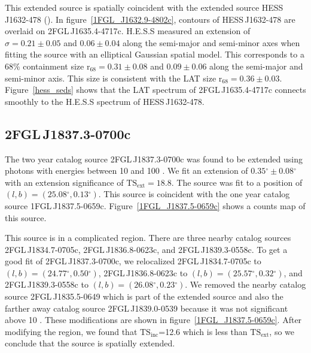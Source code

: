 \documentclass[12pt,preprint]{aastex}
\newcommand{\gev}{\text{GeV}\xspace}
\newcommand{\tev}{\text{TeV}\xspace}
\newcommand{\tsext}{{\ensuremath{\text{TS}_\text{ext}}}\xspace}
\newcommand{\tsinc}{\ensuremath{\text{TS}_\text{inc}}\xspace}
\newcommand{\rsixeight}{{\ensuremath{\text{r}_{68}}}\xspace}
\renewcommand{\deg}{\ensuremath{^\circ}\xspace}
\begin{document}
This extended source is spatially coincident with the extended
\tev source HESS\,J1632-478 (\cite{hess_plane_survey}).  In
figure~\ref{1FGL_J1632.9-4802c}, contours of  HESS\,J1632-478 are
overlaid on 2FGL\,J1635.4-4717c.  H.E.S.S measured an extension of
$\sigma=0.21\pm0.05$ and $0.06\pm0.04$ along the semi-major and semi-minor
axes when fitting the source with an elliptical Gaussian spatial model.
This corresponds to a 68\% containment size $\rsixeight=0.31\pm0.08$
and $0.09\pm0.06$ along the semi-major and semi-minor axis. This
size is consistent with the LAT size $\rsixeight=0.36\pm0.03$.
Figure~\ref{hess_seds} shows that the LAT spectrum of 2FGL\,J1635.4-4717c
connects smoothly to the H.E.S.S spectrum of HESS\,J1632-478.


\subsection{2FGL\,J1837.3-0700c}
\label{section_2FGL_J1837.3-0700c}




The two year catalog source 2FGL\,J1837.3-0700c was found to be
extended using photons with energies between 10 \gev and 100 \gev.
We fit an extension of $0.35\deg\pm0.08\deg$ with an extension
significance of $\tsext=18.8$.  The source was fit to a position of
$(l,b)=(25.08\deg,0.13\deg)$.  This source is coincident with the one
year catalog source 1FGL\,J1837.5-0659c.  Figure~\ref{1FGL_J1837.5-0659c}
shows a counts map of this source.

This source is in a complicated region. There are three nearby
catalog sources 2FGL\,J1834.7-0705c, 2FGL\,J1836.8-0623c, and
2FGL\,J1839.3-0558c.  To get a good fit of 2FGL\,J1837.3-0700c, we
relocalized 2FGL\,J1834.7-0705c to $(l,b)=(24.77\deg,0.50\deg)$,
2FGL\,J1836.8-0623c to $(l,b)=(25.57\deg,0.32\deg)$, and
2FGL\,J1839.3-0558c to $(l,b)=(26.08\deg,0.23\deg)$.  We removed the
nearby catalog source 2FGL\,J1835.5-0649 which is part of the extended
source and also the farther away catalog source 2FGL\,J1839.0-0539
because it was not significant above 10 \gev. These modifications are
shown in figure~\ref{1FGL_J1837.5-0659c}.  After modifying the region,
we found that \tsinc=12.6 which is less than \tsext, so we conclude that
the source is spatially extended.
\end{document}

